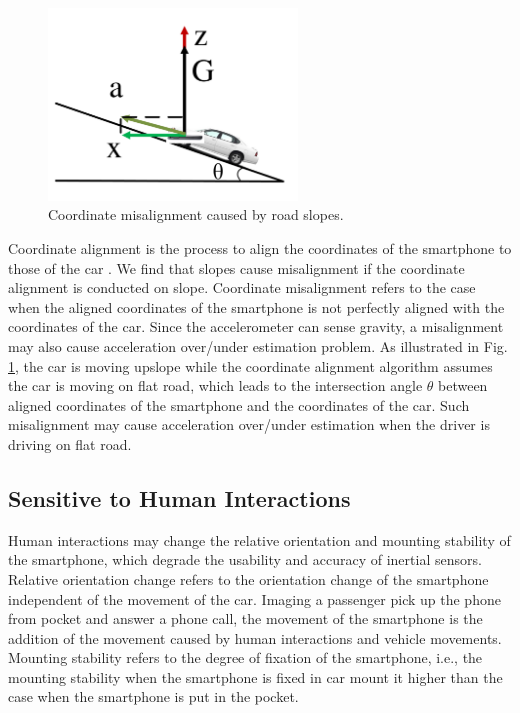 \begin{figure}[!htbp]
\begin{center}
  \vspace{-0.2cm}
  \includegraphics[width=2.6in, angle=0]{Figs/DriveSense/slopeaware/misalignment.pdf}
\vspace{-0.2cm}
\caption{Coordinate misalignment caused by road slopes.}
  \label{slopemisalignment}
\vspace{-0.4cm}
\end{center}
\end{figure}

Coordinate alignment is the process to align the
coordinates of the smartphone to those of the car 
\cite{hansenspeed, wang2013sensing, chen2015invisible}. 
We find that slopes cause misalignment
if the coordinate alignment is conducted on slope. 
Coordinate misalignment refers to the case when the aligned coordinates of 
the smartphone is not perfectly aligned with the coordinates of the car. 
Since the accelerometer can sense gravity, a misalignment
may also cause acceleration over/under estimation problem. 
As illustrated in Fig. \ref{slopemisalignment}, 
the car is moving upslope while the coordinate alignment algorithm
assumes the car is moving on flat road, 
which leads to the intersection angle $\theta$ between
aligned coordinates of the smartphone and the coordinates
of the car. 
Such misalignment may cause acceleration over/under estimation
when the driver is driving on flat road. 


\subsection{Sensitive to Human Interactions}


Human interactions may change the 
relative orientation and mounting stability of the smartphone, 
which degrade the usability and accuracy
of inertial sensors. 
Relative orientation change refers to the
orientation change of the smartphone independent of
the movement of the car. 
Imaging a passenger pick up the phone from pocket
and answer a phone call, 
the movement of the smartphone is the addition of 
the movement caused by human interactions and vehicle movements. 
Mounting stability refers to the degree of fixation of the smartphone, 
i.e., the mounting stability when the smartphone is fixed in car mount
it higher than the case when the smartphone is put in the pocket. 



